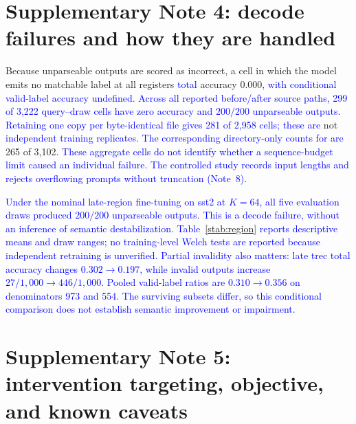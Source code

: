 \documentclass[11pt]{article}
\begin{document}
\section*{Supplementary Note 4: decode failures and how they are handled}
\label{snote:decode}

Because unparseable outputs are scored as incorrect, a cell in which the model emits no
matchable label at all registers \textcolor{blue}{total} accuracy $0.000$\textcolor{blue}{, with conditional valid-label
accuracy undefined. Across all reported before/after source paths, 299 of 3}{\textcolor{blue}{,}}\textcolor{blue}{222
query--draw cells have zero accuracy and $200/200$ unparseable outputs. Retaining one
copy per byte-identical file gives 281 of 2}{\textcolor{blue}{,}}\textcolor{blue}{958 cells; these are} not \textcolor{blue}{independent
training replicates. The corresponding directory-only counts for
} \textcolor{blue}{are} 265 of 3{,}102\textcolor{blue}{. These aggregate cells do not
identify whether a sequence-budget limit caused an individual failure. The controlled
study records input lengths and rejects overflowing prompts without truncation (Note~8).}

\textcolor{blue}{Under the nominal late-region fine-tuning on sst2 at $K{=}64$, all five evaluation draws
produced $200/200$ unparseable outputs. This is a decode failure, without an inference of
semantic destabilization. Table}~\textcolor{blue}{\ref{stab:region}} \textcolor{blue}{reports descriptive means and draw ranges;
no training-level Welch tests are reported because independent retraining is unverified.
Partial invalidity also matters: late trec total accuracy changes $0.302\to0.197$, while
invalid outputs increase $27/1{,}000\to446/1{,}000$. Pooled valid-label ratios are
$0.310\to0.356$ on denominators 973 and 554. The surviving subsets differ, so this
conditional comparison does not establish semantic improvement or impairment.}

\section*{Supplementary Note 5: intervention targeting, objective, and known caveats}
\label{snote:caveats}
\end{document}
